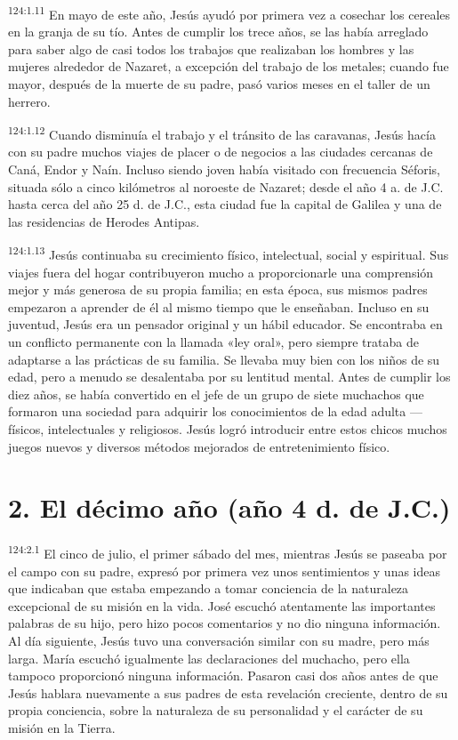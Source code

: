 \par 
\textsuperscript{124:1.11} En mayo de este año, Jesús ayudó por primera vez a cosechar los cereales en la granja de su tío. Antes de cumplir los trece años, se las había arreglado para saber algo de casi todos los trabajos que realizaban los hombres y las mujeres alrededor de Nazaret, a excepción del trabajo de los metales; cuando fue mayor, después de la muerte de su padre, pasó varios meses en el taller de un herrero.

\par 
\textsuperscript{124:1.12} Cuando disminuía el trabajo y el tránsito de las caravanas, Jesús hacía con su padre muchos viajes de placer o de negocios a las ciudades cercanas de Caná, Endor y Naín. Incluso siendo joven había visitado con frecuencia Séforis, situada sólo a cinco kilómetros al noroeste de Nazaret; desde el año 4 a. de J.C. hasta cerca del año 25 d. de J.C., esta ciudad fue la capital de Galilea y una de las residencias de Herodes Antipas.

\par 
\textsuperscript{124:1.13} Jesús continuaba su crecimiento físico, intelectual, social y espiritual. Sus viajes fuera del hogar contribuyeron mucho a proporcionarle una comprensión mejor y más generosa de su propia familia; en esta época, sus mismos padres empezaron a aprender de él al mismo tiempo que le enseñaban. Incluso en su juventud, Jesús era un pensador original y un hábil educador. Se encontraba en un conflicto permanente con la llamada «ley oral», pero siempre trataba de adaptarse a las prácticas de su familia. Se llevaba muy bien con los niños de su edad, pero a menudo se desalentaba por su lentitud mental. Antes de cumplir los diez años, se había convertido en el jefe de un grupo de siete muchachos que formaron una sociedad para adquirir los conocimientos de la edad adulta ---físicos, intelectuales y religiosos. Jesús logró introducir entre estos chicos muchos juegos nuevos y diversos métodos mejorados de entretenimiento físico.

\section*{2. El décimo año (año 4 d. de J.C.)}
\par 
\textsuperscript{124:2.1} El cinco de julio, el primer sábado del mes, mientras Jesús se paseaba por el campo con su padre, expresó por primera vez unos sentimientos y unas ideas que indicaban que estaba empezando a tomar conciencia de la naturaleza excepcional de su misión en la vida. José escuchó atentamente las importantes palabras de su hijo, pero hizo pocos comentarios y no dio ninguna información. Al día siguiente, Jesús tuvo una conversación similar con su madre, pero más larga. María escuchó igualmente las declaraciones del muchacho, pero ella tampoco proporcionó ninguna información. Pasaron casi dos años antes de que Jesús hablara nuevamente a sus padres de esta revelación creciente, dentro de su propia conciencia, sobre la naturaleza de su personalidad y el carácter de su misión en la Tierra.

